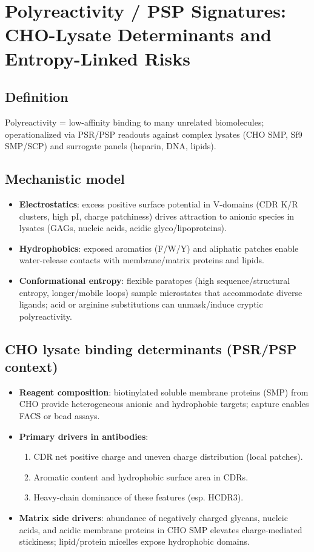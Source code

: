 \section*{Polyreactivity / PSP Signatures: CHO-Lysate Determinants and Entropy-Linked Risks}

\subsection*{Definition}
Polyreactivity = low-affinity binding to many unrelated biomolecules; operationalized via PSR/PSP readouts against complex lysates (CHO SMP, Sf9 SMP/SCP) and surrogate panels (heparin, DNA, lipids).

\subsection*{Mechanistic model}
\begin{itemize}\setlength\itemsep{2pt}
\item \textbf{Electrostatics}: excess positive surface potential in V-domains (CDR K/R clusters, high pI, charge patchiness) drives attraction to anionic species in lysates (GAGs, nucleic acids, acidic glyco/lipoproteins).
\item \textbf{Hydrophobics}: exposed aromatics (F/W/Y) and aliphatic patches enable water-release contacts with membrane/matrix proteins and lipids.
\item \textbf{Conformational entropy}: flexible paratopes (high sequence/structural entropy, longer/mobile loops) sample microstates that accommodate diverse ligands; acid or arginine substitutions can unmask/induce cryptic polyreactivity.
\end{itemize}

\subsection*{CHO lysate binding determinants (PSR/PSP context)}
\begin{itemize}\setlength\itemsep{2pt}
\item \textbf{Reagent composition}: biotinylated soluble membrane proteins (SMP) from CHO provide heterogeneous anionic and hydrophobic targets; capture enables FACS or bead assays.
\item \textbf{Primary drivers in antibodies}: 
  \begin{enumerate}\setlength\itemsep{1pt}
  \item CDR net positive charge and uneven charge distribution (local patches).
  \item Aromatic content and hydrophobic surface area in CDRs.
  \item Heavy-chain dominance of these features (esp. HCDR3).
  \end{enumerate}
\item \textbf{Matrix side drivers}: abundance of negatively charged glycans, nucleic acids, and acidic membrane proteins in CHO SMP elevates charge-mediated stickiness; lipid/protein micelles expose hydrophobic domains.
\end{itemize}

